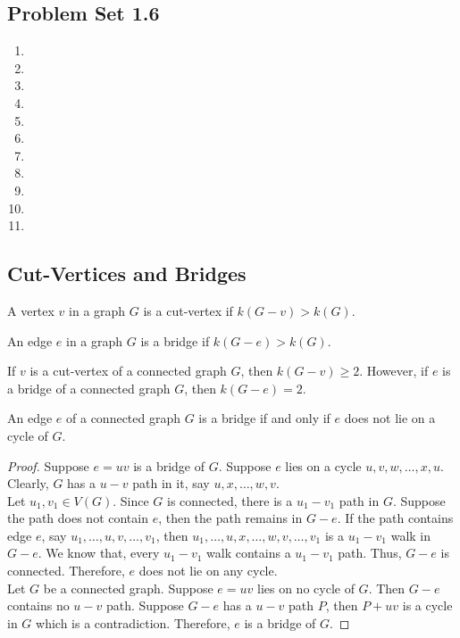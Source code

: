 \subsection*{Problem Set 1.6}
\begin{enumerate}
	\item
	\item 
	\item
	\item
	\item
	\item
	\item
	\item
	\item
	\item
	\item
\end{enumerate}

\subsection{Cut-Vertices and Bridges}
\begin{definition}
	A vertex $v$ in a graph $G$ is a cut-vertex if $k(G-v) > k(G)$.
\end{definition}

\begin{definition}
	An edge $e$ in a graph $G$ is a bridge if $k(G-e) > k(G)$.
\end{definition}

\begin{remark}
	If $v$ is a cut-vertex of a connected graph $G$, then $k(G-v) \ge 2$. However, if $e$ is a bridge of a connected graph $G$, then $k(G-e) = 2$.
\end{remark}	

\begin{theorem}
	An edge $e$ of a connected graph $G$ is a bridge if and only if $e$ does not lie on a cycle of $G$.
\end{theorem}
\begin{proof}
	Suppose $e = uv$ is a bridge of $G$.
	Suppose $e$ lies on a cycle $u,v,w,\dots,x,u$.
	Clearly, $G$ has a $u-v$ path in it, say $u,x,\dots,w,v$.\\

	Let $u_1,v_1 \in V(G)$.
	Since $G$ is connected, there is a $u_1-v_1$ path in $G$.
	Suppose the path does not contain $e$, then the path remains in $G-e$.
	If the path contains edge $e$, say $u_1,\dots,u,v,\dots,v_1$, then $u_1,\dots,u,x,\dots,w,v,\dots,v_1$ is a $u_1-v_1$ walk in $G-e$.
	We know that, every $u_1-v_1$ walk contains a $u_1-v_1$ path.
	Thus, $G-e$ is connected.
	Therefore, $e$ does not lie on any cycle.\\

	Let $G$ be a connected graph.
	Suppose $e = uv$ lies on no cycle of $G$.
	Then $G-e$ contains no $u-v$ path.
	Suppose $G-e$ has a $u-v$ path $P$, then $P + uv$ is a cycle in $G$ which is a contradiction.
	Therefore, $e$ is a bridge of $G$.
\end{proof}

